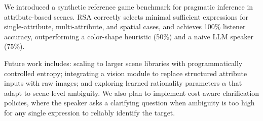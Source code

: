 \documentclass[10pt]{article}
\begin{document}
We introduced a synthetic reference game benchmark for pragmatic inference in attribute-based scenes. RSA correctly selects minimal sufficient expressions for single-attribute, multi-attribute, and spatial cases, and achieves 100\% listener accuracy, outperforming a color-shape heuristic (50\%) and a naive LLM speaker (75\%).

Future work includes: scaling to larger scene libraries with programmatically controlled entropy; integrating a vision module to replace structured attribute inputs with raw images; and exploring learned rationality parameters $\alpha$ that adapt to scene-level ambiguity. We also plan to implement cost-aware clarification policies, where the speaker asks a clarifying question when ambiguity is too high for any single expression to reliably identify the target.



\end{document}
